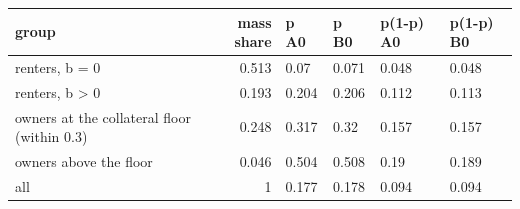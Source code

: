 \begingroup\small
\setlength{\tabcolsep}{3pt}
\renewcommand{\arraystretch}{1.04}
\begin{tabularx}{\linewidth}{XrXXXX}
\toprule
group & mass share & p A0 & p B0 & p(1-p) A0 & p(1-p) B0 \\
\midrule
renters, b = 0 & 0.513 & 0.07 & 0.071 & 0.048 & 0.048 \\
renters, b \textgreater{} 0 & 0.193 & 0.204 & 0.206 & 0.112 & 0.113 \\
owners at the collateral floor (within 0.3) & 0.248 & 0.317 & 0.32 & 0.157 & 0.157 \\
owners above the floor & 0.046 & 0.504 & 0.508 & 0.19 & 0.189 \\
all & 1 & 0.177 & 0.178 & 0.094 & 0.094 \\
\bottomrule
\end{tabularx}
\endgroup

